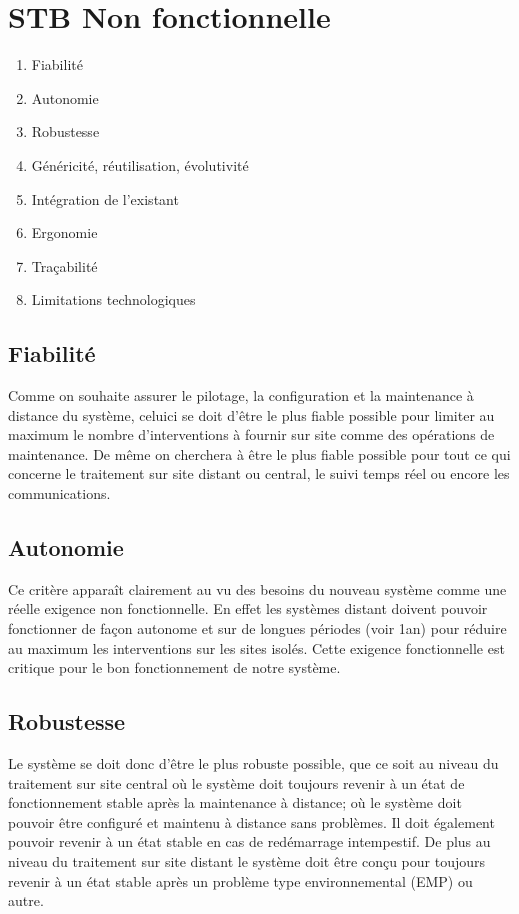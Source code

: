\section{STB Non fonctionnelle}

\begin{enumerate}
       \item Fiabilité
       \item Autonomie
       \item Robustesse
       \item Généricité, réutilisation, évolutivité 
       \item Intégration de l'existant
       \item Ergonomie
       \item Traçabilité
       \item Limitations technologiques
 \end{enumerate}

\subsection{Fiabilité}
Comme on souhaite assurer le pilotage, la configuration et la maintenance à distance du système, celuici se doit d’être le plus fiable possible pour limiter au maximum le nombre d’interventions à fournir sur site comme des opérations de maintenance. De même on cherchera à être le plus fiable possible pour tout ce qui concerne le traitement sur site distant ou central, le suivi temps réel ou encore les communications.

\subsection{Autonomie}
	Ce critère apparaît clairement au vu des besoins du nouveau système comme une réelle exigence non fonctionnelle.
En effet les systèmes distant doivent pouvoir fonctionner de façon autonome et sur de longues périodes (voir 1an)
pour réduire au maximum les interventions sur les sites isolés. Cette exigence fonctionnelle est critique pour le bon
fonctionnement de notre système.

\subsection{Robustesse}
Le système se doit donc d’être le plus robuste possible, que ce soit au niveau du traitement sur site central où le système 
doit toujours revenir à un état de fonctionnement stable après la maintenance à distance; où le système doit pouvoir être
 configuré et maintenu à distance sans problèmes. Il doit également pouvoir revenir à un état stable en cas de redémarrage 
intempestif. De plus au niveau du traitement sur site distant le système doit être conçu pour toujours revenir 
à un état stable après un problème type environnemental (EMP) ou autre.

